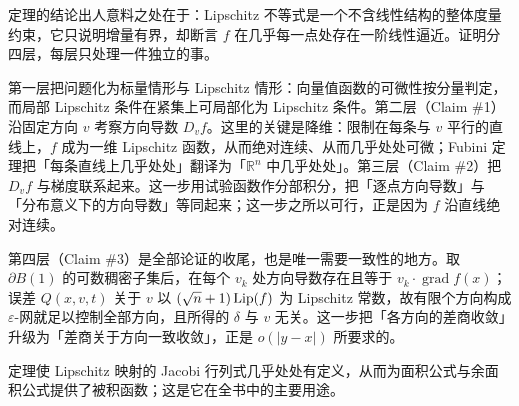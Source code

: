 \documentclass[../../main.tex]{subfiles}%
\begin{document}
\begin{remark}\label{remark:ch03-thm-3-2-动机}
定理的结论出人意料之处在于：Lipschitz 不等式是一个不含线性结构的整体度量约束，它只说明增量有界，却断言 $f$ 在几乎每一点处存在一阶线性逼近。证明分四层，每层只处理一件独立的事。

第一层把问题化为标量情形与 Lipschitz 情形：向量值函数的可微性按分量判定，而局部 Lipschitz 条件在紧集上可局部化为 Lipschitz 条件。第二层（Claim \#1）沿固定方向 $v$ 考察方向导数 $D_vf$。这里的关键是降维：限制在每条与 $v$ 平行的直线上，$f$ 成为一维 Lipschitz 函数，从而绝对连续、从而几乎处处可微；Fubini 定理把「每条直线上几乎处处」翻译为「$\mathbb{R}^n$ 中几乎处处」。第三层（Claim \#2）把 $D_vf$ 与梯度联系起来。这一步用试验函数作分部积分，把「逐点方向导数」与「分布意义下的方向导数」等同起来；这一步之所以可行，正是因为 $f$ 沿直线绝对连续。

第四层（Claim \#3）是全部论证的收尾，也是唯一需要一致性的地方。取 $\partial B(1)$ 的可数稠密子集后，在每个 $v_k$ 处方向导数存在且等于 $v_k\cdot\operatorname{grad}f(x)$；误差 $Q(x,v,t)$ 关于 $v$ 以 $(\sqrt{n}+1)\operatorname{Lip}(f)$ 为 Lipschitz 常数，故有限个方向构成 $\varepsilon$-网就足以控制全部方向，且所得的 $\delta$ 与 $v$ 无关。这一步把「各方向的差商收敛」升级为「差商关于方向一致收敛」，正是 $o(\lvert y-x\rvert)$ 所要求的。

定理使 Lipschitz 映射的 Jacobi 行列式几乎处处有定义，从而为面积公式与余面积公式提供了被积函数；这是它在全书中的主要用途。
\end{remark}
\end{document}
